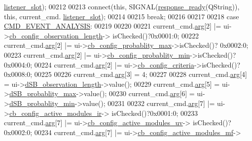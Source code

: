 \begin{DoxyCode}
      \hyperlink{a00001_abb76d8edb39876deb60975c8fd784b3f}{listener\_slot});
00212 
00213             connect(\textcolor{keyword}{this}, SIGNAL(\hyperlink{a00006_a3f6396874778799cf07a7a0149e54977}{response\_ready}(QString)), \textcolor{keyword}{this}, current\_cmd.
      \hyperlink{a00001_abb76d8edb39876deb60975c8fd784b3f}{listener\_slot});
00214 
00215         \textcolor{keywordflow}{break};
00216 
00217 
00218     \textcolor{keywordflow}{case} \hyperlink{a00031_a3a15793e3ab7817f2429edf04de693a0}{CMD\_EVENT\_ANALYSIS}:
00219 
00220 
00221             current\_cmd.\hyperlink{a00001_a56e6c2d7315d0ae60a51e8b140c9cfe4}{arg}[2]     |= ui->\hyperlink{a00027_ae9e8f3f0d147a4cd21c8f36ffb3bd81f}{cb\_config\_observation\_length}->
      isChecked()?0x0001:0;
00222             current\_cmd.\hyperlink{a00001_a56e6c2d7315d0ae60a51e8b140c9cfe4}{arg}[2]     |= ui->\hyperlink{a00027_ad0a7ea02564c112595f0d30efa75eef2}{cb\_config\_probablity\_max}->isChecked()?
      0x0002:0;
00223             current\_cmd.\hyperlink{a00001_a56e6c2d7315d0ae60a51e8b140c9cfe4}{arg}[2]     |= ui->\hyperlink{a00027_a6e32cc42adcf308df94cbbc9ac226f50}{cb\_config\_probablity\_min}->isChecked()?
      0x0004:0;
00224             current\_cmd.\hyperlink{a00001_a56e6c2d7315d0ae60a51e8b140c9cfe4}{arg}[2]     |= ui->\hyperlink{a00027_a89574c631636929702a5928b2a159892}{cb\_config\_criteria}->isChecked()?0x0008:0;
00225 
00226             current\_cmd.\hyperlink{a00001_a56e6c2d7315d0ae60a51e8b140c9cfe4}{arg}[3]      = 4;
00227 
00228             current\_cmd.\hyperlink{a00001_a56e6c2d7315d0ae60a51e8b140c9cfe4}{arg}[4]      = ui->\hyperlink{a00027_a1fe1bf902f2a365c4c94612d2a2ffbcc}{dSB\_observation\_length}->value();
00229             current\_cmd.\hyperlink{a00001_a56e6c2d7315d0ae60a51e8b140c9cfe4}{arg}[5]      = ui->\hyperlink{a00027_a137b79e810736643ac4b15e221909871}{dSB\_probablity\_max}->value();
00230             current\_cmd.\hyperlink{a00001_a56e6c2d7315d0ae60a51e8b140c9cfe4}{arg}[6]      = ui->\hyperlink{a00027_adfd6cf470c736f358c6982f9a635f04f}{dSB\_probablity\_min}->value();
00231 
00232             current\_cmd.\hyperlink{a00001_a56e6c2d7315d0ae60a51e8b140c9cfe4}{arg}[7]     |= ui->\hyperlink{a00027_abef4ef3d5d03026de5d5e172eb0335a6}{cb\_config\_active\_modules\_ir}->
      isChecked()?0x0001:0;
00233             current\_cmd.\hyperlink{a00001_a56e6c2d7315d0ae60a51e8b140c9cfe4}{arg}[7]     |= ui->\hyperlink{a00027_a72ad8a6b100948f9b1438cf3b949be5e}{cb\_config\_active\_modules\_uv}->
      isChecked()?0x0002:0;
00234             current\_cmd.\hyperlink{a00001_a56e6c2d7315d0ae60a51e8b140c9cfe4}{arg}[7]     |= ui->\hyperlink{a00027_abc96d02b5b7a9480a2a142008e99a100}{cb\_config\_active\_modules\_mf}->

\end{DoxyCode}
